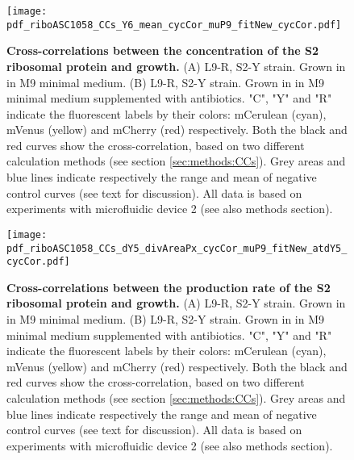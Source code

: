 \begin{figure}
    \centering
    \texttt{[image: pdf\_riboASC1058\_CCs\_Y6\_mean\_cycCor\_muP9\_fitNew\_cycCor.pdf]}
    \caption{ 
        \textbf{Cross-correlations between the concentration of the S2 ribosomal protein and growth.}
        (A) L9-R, S2-Y strain. Grown in in M9 minimal medium.
        (B) L9-R, S2-Y strain. Grown in in M9 minimal medium supplemented with antibiotics. 
        "C", "Y" and "R" indicate the fluorescent labels by their colors: mCerulean (cyan), mVenus (yellow) and mCherry (red) respectively.
        Both the black and red curves show the cross-correlation, based on two different calculation methods (see section \ref{sec:methods:CCs}).
        Grey areas and blue lines indicate respectively the range and mean of negative control curves (see text for discussion).
        All data is based on experiments with microfluidic device 2 (see also methods section).
    }
    \label{fig:ribo:CCsEmuS2}
\end{figure}

\begin{figure}
    \centering
    \texttt{[image: pdf\_riboASC1058\_CCs\_dY5\_divAreaPx\_cycCor\_muP9\_fitNew\_atdY5\_cycCor.pdf]}
    \caption{ 
        \textbf{Cross-correlations between the production rate of the S2 ribosomal protein and growth.}
        (A) L9-R, S2-Y strain. Grown in in M9 minimal medium.
        (B) L9-R, S2-Y strain. Grown in in M9 minimal medium supplemented with antibiotics. 
        "C", "Y" and "R" indicate the fluorescent labels by their colors: mCerulean (cyan), mVenus (yellow) and mCherry (red) respectively.
        Both the black and red curves show the cross-correlation, based on two different calculation methods (see section \ref{sec:methods:CCs}).
        Grey areas and blue lines indicate respectively the range and mean of negative control curves (see text for discussion).
        All data is based on experiments with microfluidic device 2 (see also methods section).
%
    }
    \label{fig:ribo:CCsPmuS2}
\end{figure}




